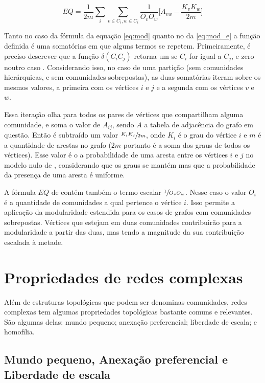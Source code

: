 \documentclass[notes.tex]{subfiles}
\begin{document}
\begin{equation}\label{eq:mod_e}
    EQ = \frac{1}{2m}\sum_{i}\sum_{v \in C_i, w \in C_i}\frac{1}{O_vO_w}\Bigg[A_{vw} - \frac{K_vK_w}{2m} \Bigg]
\end{equation}

Tanto no caso da fórmula da equação \ref{eq:mod} quanto no da \ref{eq:mod_e} a função definida é uma somatórias em que alguns termos se repetem.
Primeiramente, é preciso descrever que a função $\delta(C_iC_j)$ retorna um se $C_i$ for igual a  $C_j$, e zero noutro caso \cite{fortunato2010community}.
Considerando isso, no caso de uma partição (sem comunidades hierárquicas, e sem comunidades sobrepostas), as duas somatórias iteram sobre os mesmos valores, a primeira com os vértices $i$ e $j$ e a segunda com os vértices $v$ e  $w$.

Essa iteração olha para todos os pares de vértices que compartilham alguma comunidade, e soma o valor de $A_{ij}$, sendo $A$ a tabela de adjacência do grafo em questão.
Então é subtraído um valor $\sfrac{K_iK_j}{2m}$, onde  $K_i$ é o grau do vértice $i$ e  $m$ é a quantidade de arestas no grafo ($2m$ portanto é a soma dos graus de todos os vértices).
Esse valor é o a probabilidade de uma aresta entre os vértices  $i$ e  $j$ no modelo nulo de , considerando que os graus se mantém mas que a probabilidade da presença de uma aresta é uniforme.

A fórmula $EQ$ de  contém também o termo escalar $\sfrac{1}{O_vO_w}$.
Nesse caso o valor $O_i$ é a quantidade de comunidades a qual pertence o vértice $i$.
Isso permite a aplicação da modularidade estendida para os casos de grafos com comunidades sobrepostas.
Vértices que estejam em duas comunidades contribuirão para a modularidade a partir das duas, mas tendo a magnitude da sua contribuição escalada à metade.

\section{Propriedades de redes complexas}

Além de estruturas topológicas que podem ser denominas comunidades, redes complexas tem algumas propriedades topológicas bastante comuns e relevantes.
São algumas delas: mundo pequeno; anexação preferencial; liberdade de escala; e homofilia.

\subsection{Mundo pequeno, Anexação preferencial e Liberdade de escala}
\end{document}

